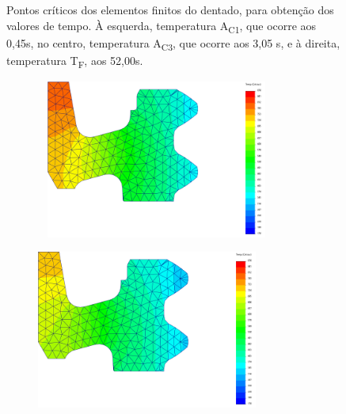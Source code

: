 \begin{figure}[htb]
\begin{subfigure}{.33\textwidth}
        \caption{}
        \label{fig:Tf_Dent}
    \end{subfigure}
    \caption[Pontos críticos dos elementos finitos do dentado]%
    {Pontos críticos dos elementos finitos do dentado, para obtenção dos valores de tempo. À esquerda, temperatura A\textsubscript{C1}, que ocorre aos 0,45s, no centro, temperatura A\textsubscript{C3}, que ocorre aos 3,05 s, e à direita, temperatura T\textsubscript{F}, aos 52,00s.}
    \label{fig:Dentado}
\end{figure}
\begin{figure}[htb]
    \centering
    \begin{subfigure}{.33\textwidth}\
        \centering
        \includegraphics[width = 0.8\textwidth]{Figures/Cap4/AC3_Diametro.png}
        \caption[]%
        {}
        \label{fig:A3_Dint}
    \end{subfigure}%
    \begin{subfigure}{.33\textwidth}
        \centering
        \includegraphics[width = 0.8\textwidth]{Figures/Cap4/AC1_Diametro.png}

\end{subfigure}
\end{figure}
